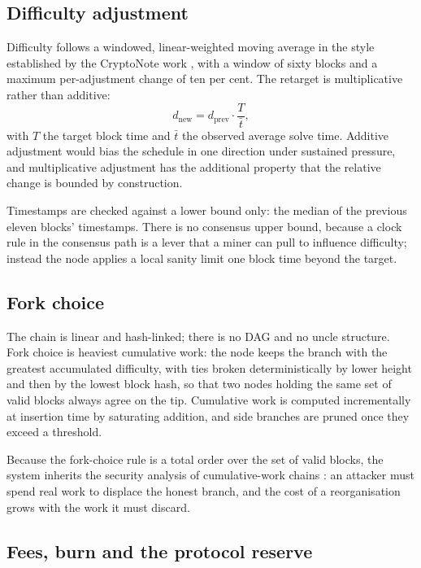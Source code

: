 \documentclass{article}
\begin{document}
\subsection{Difficulty adjustment}

Difficulty follows a windowed, linear-weighted moving average in the style
established by the CryptoNote work \cite{cryptonote2012whitepaper}, with a
window of sixty blocks and a maximum per-adjustment change of ten per cent. The
retarget is multiplicative rather than additive:
\begin{equation}
d_{\mathrm{new}} = d_{\mathrm{prev}} \cdot \frac{T}{\bar{t}},
\label{eq:retarget}
\end{equation}
with $T$ the target block time and $\bar{t}$ the observed average solve time.
Additive adjustment would bias the schedule in one direction under sustained
pressure, and multiplicative adjustment has the additional property that the
relative change is bounded by construction.

Timestamps are checked against a lower bound only: the median of the previous
eleven blocks' timestamps. There is no consensus upper bound, because a
clock rule in the consensus path is a lever that a miner can pull to influence
difficulty; instead the node applies a local sanity limit one block time beyond
the target.

\subsection{Fork choice}

The chain is linear and hash-linked; there is no DAG and no uncle structure.
Fork choice is heaviest cumulative work: the node keeps the branch with the
greatest accumulated difficulty, with ties broken deterministically by lower
height and then by the lowest block hash, so that two nodes holding the same
set of valid blocks always agree on the tip. Cumulative work is computed
incrementally at insertion time by saturating addition, and side branches are
pruned once they exceed a threshold.

Because the fork-choice rule is a total order over the set of valid blocks,
the system inherits the security analysis of cumulative-work chains
\cite{eyal2014securitybitcoin,kiayias2017equitable}: an attacker must spend
real work to displace the honest branch, and the cost of a reorganisation
grows with the work it must discard.

\subsection{Fees, burn and the protocol reserve}
\end{document}
